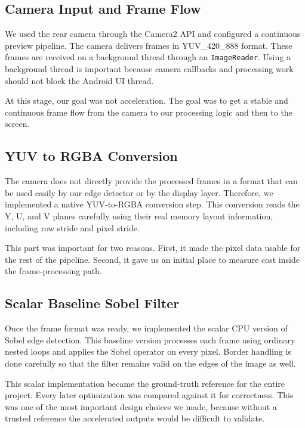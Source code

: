 \documentclass[12pt,a4paper]{article}
\begin{document}
\subsection{Camera Input and Frame Flow}

We used the rear camera through the Camera2 API and configured a continuous preview pipeline. The camera delivers frames in YUV\_420\_888 format. These frames are received on a background thread through an \texttt{ImageReader}. Using a background thread is important because camera callbacks and processing work should not block the Android UI thread.

At this stage, our goal was not acceleration. The goal was to get a stable and continuous frame flow from the camera to our processing logic and then to the screen.

\subsection{YUV to RGBA Conversion}

The camera does not directly provide the processed frames in a format that can be used easily by our edge detector or by the display layer. Therefore, we implemented a native YUV-to-RGBA conversion step. This conversion reads the Y, U, and V planes carefully using their real memory layout information, including row stride and pixel stride.

This part was important for two reasons. First, it made the pixel data usable for the rest of the pipeline. Second, it gave us an initial place to measure cost inside the frame-processing path.

\subsection{Scalar Baseline Sobel Filter}

Once the frame format was ready, we implemented the scalar CPU version of Sobel edge detection. This baseline version processes each frame using ordinary nested loops and applies the Sobel operator on every pixel. Border handling is done carefully so that the filter remains valid on the edges of the image as well.

This scalar implementation became the ground-truth reference for the entire project. Every later optimization was compared against it for correctness. This was one of the most important design choices we made, because without a trusted reference the accelerated outputs would be difficult to validate.
\end{document}
